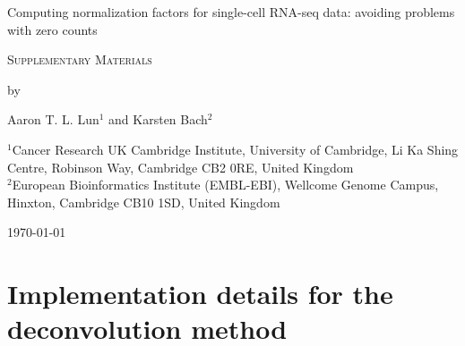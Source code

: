 \documentclass{article}
\begin{document}
\begin{titlepage}
\vspace*{3cm}
\begin{center}

{\LARGE
Computing normalization factors for single-cell RNA-seq data: avoiding problems with zero counts
\par}

\vspace{0.75cm}

{\Large 
    \textsc{Supplementary Materials}
\par
}
\vspace{0.75cm}

\large
by

\vspace{0.75cm}
Aaron T. L. Lun$^{1}$ and Karsten Bach$^{2}$

\vspace{1cm}
\begin{minipage}{0.9\textwidth}
\begin{flushleft} 
$^1$Cancer Research UK Cambridge Institute, University of Cambridge, Li Ka Shing Centre, Robinson Way, Cambridge CB2 0RE, United Kingdom \\[6pt]
$^2$European Bioinformatics Institute (EMBL-EBI), Wellcome Genome Campus, Hinxton, Cambridge CB10 1SD, United Kingdom \\[6pt]
\end{flushleft}
\end{minipage}

\vspace{1.5cm}
{\large \today{}}

\vspace*{\fill}
\end{center}
\end{titlepage}

\section{Implementation details for the deconvolution method}
\end{document}
